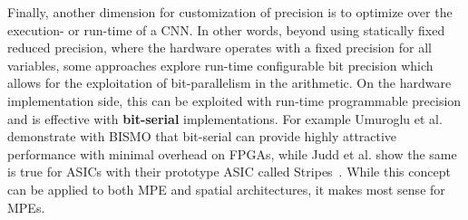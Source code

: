 Finally, another dimension for customization of precision is to optimize over the execution- or run-time of a CNN.
In other words, beyond using statically fixed reduced precision, where the hardware operates with a fixed precision for all variables, some approaches explore run-time configurable bit precision which allows for the exploitation of bit-parallelism in the arithmetic. 
On the hardware implementation side, this can be exploited with run-time programmable precision and is effective with \textbf{bit-serial} implementations. 
For example Umuroglu et al.~\cite{umuroglu2018BISMO} demonstrate with BISMO that bit-serial can provide highly attractive performance with minimal overhead on FPGAs, while Judd et al. show the same is true for ASICs with their prototype ASIC called Stripes~\cite{judd2016stripes}. 
While this concept can be applied to both MPE and spatial architectures, it makes most sense for MPEs.


